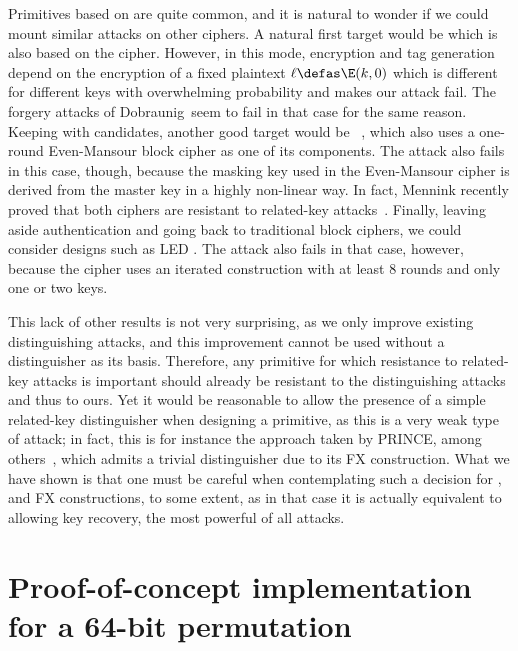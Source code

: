 Primitives based on \EM are quite common, and it is natural to wonder if we could mount similar
attacks on other ciphers. A natural first target would be \proestcopa which is also based on the \proestem cipher.
However, in this mode,
encryption and tag generation depend on the encryption of a fixed plaintext $\ell \defas \E(k, 0)$ which is different
for different keys with overwhelming probability and makes our attack fail. The forgery attacks of
Dobraunig~\etal seem to fail in that case for the same reason.
Keeping with \caesar candidates, another good target would be \minalpher~\cite{minalpher}, which also
uses a one-round Even-Mansour block cipher as one of its components. The attack also fails in this
case, though, because the masking key used in the Even-Mansour cipher is derived from the master key
in a highly non-linear way. In fact, Mennink recently proved that both ciphers are resistant
to related-key attacks~\cite{DBLP:conf/crypto/Mennink16}.
Finally, leaving aside authentication and
going back to traditional block ciphers, we could consider designs such as LED \cite{LED}. The attack
also fails in that case, however, because the cipher uses an iterated construction with at least 8 rounds and
only one or two keys.

This lack of other results is not very surprising, as we only improve existing distinguishing
attacks, and this improvement cannot be used without a distinguisher as its basis.
Therefore, any primitive for which resistance to related-key attacks is important should already be resistant
to the distinguishing attacks and thus to ours. Yet it would be reasonable to allow the presence
of a simple related-key distinguisher when designing a primitive, as this is a very weak type of
attack; in fact, this is for instance the approach taken by PRINCE, among others~\cite{PRINCE}, which admits
a trivial distinguisher due to its \textsf{FX} construction.
What we have shown is that one must be
careful when contemplating such a decision for \EM, and \textsf{FX} constructions, to some extent, as in that case it is actually
equivalent to allowing key recovery, the most powerful of all attacks.

\setcounter{section}{0}
\renewcommand\thesection{\Alph{section}}

\section{Proof-of-concept implementation for a 64-bit permutation}
\label{sec:toy}

